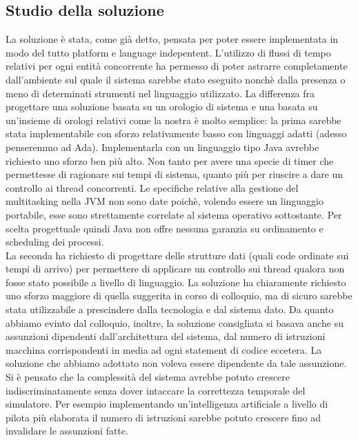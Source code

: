 \subsection{Studio della soluzione}
La soluzione è stata, come già detto, pensata per poter essere implementata in modo del tutto platform e language indepentent. L’utilizzo di flussi di tempo relativi per ogni entità concorrente ha permesso di poter astrarre completamente dall’ambiente sul quale il sistema sarebbe stato eseguito nonchè dalla presenza o meno di determinati strumenti nel linguaggio utilizzato.
La differenza fra progettare una soluzione basata su un orologio di sistema e una basata su un'insieme di orologi relativi come la nostra è molto semplice: la prima sarebbe stata implementabile con sforzo relativamente basso con linguaggi adatti (adesso penseremmo ad Ada). Implementarla con un linguaggio tipo Java avrebbe richiesto uno sforzo ben più alto. Non tanto per avere una specie di timer che permettesse di ragionare sui tempi di sistema, quanto più per riuscire a dare un controllo ai thread concorrenti. Le specifiche relative alla gestione del multitasking nella JVM non sono date poichè, volendo essere un linguaggio portabile, esse sono strettamente correlate al sistema operativo sottostante. Per scelta progettuale quindi Java non offre nessuna garanzia su ordinamento e scheduling dei processi.\\
La seconda ha richiesto di progettare delle strutture dati (quali code ordinate sui tempi di arrivo) per permettere di applicare un controllo sui thread qualora non fosse stato possibile a livello di linguaggio. La soluzione ha chiaramente richiesto uno sforzo maggiore di quella suggerita in corso di colloquio, ma di sicuro sarebbe stata utilizzabile a prescindere dalla tecnologia e dal sistema dato.
Da quanto abbiamo evinto dal colloquio, inoltre, la soluzione consigliata si basava anche su assunzioni dipendenti dall’architettura del sistema, dal numero di istruzioni macchina corrispondenti in media ad ogni statement di codice eccetera. La soluzione che abbiamo adottato non voleva essere dipendente da tale assunzione. Si è pensato che la complessità del sistema avrebbe potuto crescere indiscriminatamente senza dover intaccare la correttezza temporale del simulatore. Per esempio implementando un’intelligenza artificiale a livello di pilota più elaborata il numero di istruzioni sarebbe  potuto crescere fino ad invalidare le assunzioni fatte.
